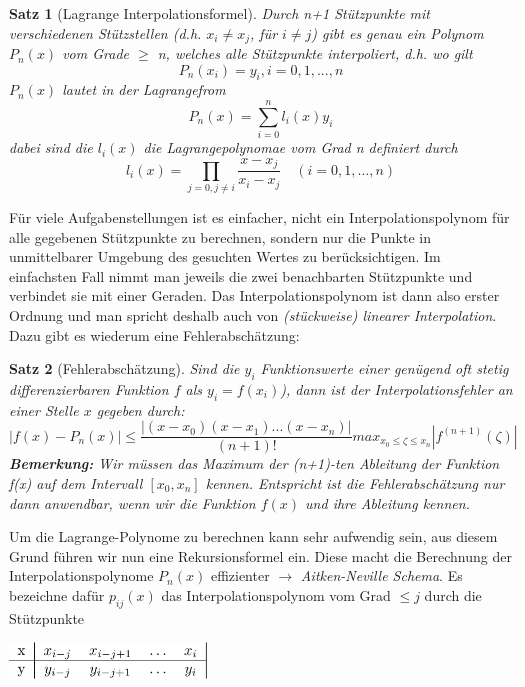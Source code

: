 \documentclass{article}
\newenvironment{Figure}
	{\par\medskip\noindent\minipage{\linewidth}}
	{\endminipage\par\medskip}
\theoremstyle{satz}
\newtheorem*{satz}{Satz}
\theoremstyle{definition}
\begin{document}
\theoremstyle{satz}
\begin{tcolorbox}
\begin{satz}[Lagrange Interpolationsformel]
Durch n+1 Stützpunkte mit verschiedenen Stützstellen (d.h. $x_i \neq x_j$, für $i \neq j$) gibt es genau ein Polynom $P_n(x)$ vom Grade $\geq$ n, welches alle Stützpunkte interpoliert, d.h. wo gilt
\begin{equation}
P_n(x_i) = y_i, i = 0,1,...,n
\end{equation}
$P_n(x)$ lautet in der Lagrangefrom
\begin{equation}
	P_n(x) = \sum\limits_{i=0}^n l_i(x) y_i
\end{equation} 
dabei sind die $l_i(x)$ die Lagrangepolynomae vom Grad n definiert durch
\begin{equation}
	l_i(x) = \prod\limits_{j=0, j\neq i} \frac{x-x_j}{x_i - x_j} \quad (i = 0, 1, ..., n)
\end{equation}
\end{satz}
\end{tcolorbox}
Für viele Aufgabenstellungen ist es einfacher, nicht ein Interpolationspolynom für alle gegebenen Stützpunkte zu berechnen, sondern nur die Punkte in unmittelbarer Umgebung des gesuchten Wertes zu berücksichtigen. Im einfachsten Fall nimmt man jeweils die zwei benachbarten Stützpunkte und verbindet sie mit einer Geraden. Das Interpolationspolynom ist dann also erster Ordnung und man spricht deshalb auch von \textit{(stückweise) linearer Interpolation}. Dazu gibt es wiederum eine Fehlerabschätzung:

\theoremstyle{satz}
\begin{tcolorbox}
\begin{satz}[Fehlerabschätzung]
Sind die $y_i$ Funktionswerte einer genügend oft stetig differenzierbaren Funktion $f$ als $y_i = f(x_i)$), dann ist der Interpolationsfehler an einer Stelle $x$ gegeben durch:
\begin{equation}
|f(x) - P_n(x)| \leq \frac{|(x-x_0)(x-x_1)...(x-x_n)|}{(n+1)!} max_{x_0 \leq \zeta \leq x_n}| f^{(n+1)}(\zeta)|
\end{equation}
\textbf{Bemerkung:} Wir müssen das Maximum der (n+1)-ten Ableitung der Funktion f(x) auf dem Intervall $[x_0,x_n]$ kennen. Entspricht ist die Fehlerabschätzung nur dann anwendbar, wenn wir die Funktion $f(x)$ und ihre Ableitung kennen.
\end{satz}
\end{tcolorbox}

Um die Lagrange-Polynome zu berechnen kann sehr aufwendig sein, aus diesem Grund führen wir nun eine Rekursionsformel ein. Diese macht die Berechnung der Interpolationspolynome $P_n(x)$ effizienter $\rightarrow$ \textit{Aitken-Neville Schema}. Es bezeichne dafür $p_{ij}(x)$ das Interpolationspolynom vom Grad $\leq j$ durch die Stützpunkte
\begin{Figure}
\centering
\includegraphics[width=200px]{img/AitkenNevilleStuetzpunkte.png}
	\label{fig:Stützpunkte für das Aitken-Neville-Schema}
\end{Figure}
\end{document}

